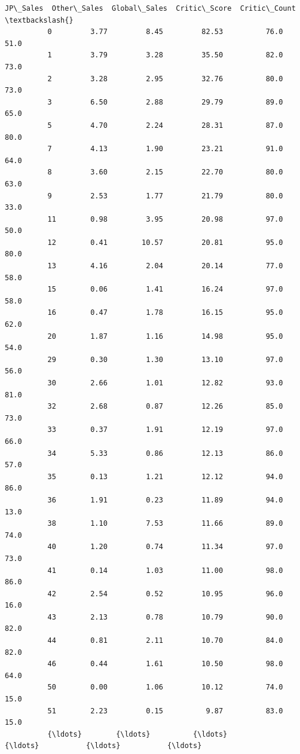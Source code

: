 \documentclass[11pt]{article}
\begin{document}
\begin{Verbatim}[commandchars=\\\{\}]
                JP\_Sales  Other\_Sales  Global\_Sales  Critic\_Score  Critic\_Count  \textbackslash{}
          0         3.77         8.45         82.53          76.0          51.0   
          1         3.79         3.28         35.50          82.0          73.0   
          2         3.28         2.95         32.76          80.0          73.0   
          3         6.50         2.88         29.79          89.0          65.0   
          5         4.70         2.24         28.31          87.0          80.0   
          7         4.13         1.90         23.21          91.0          64.0   
          8         3.60         2.15         22.70          80.0          63.0   
          9         2.53         1.77         21.79          80.0          33.0   
          11        0.98         3.95         20.98          97.0          50.0   
          12        0.41        10.57         20.81          95.0          80.0   
          13        4.16         2.04         20.14          77.0          58.0   
          15        0.06         1.41         16.24          97.0          58.0   
          16        0.47         1.78         16.15          95.0          62.0   
          20        1.87         1.16         14.98          95.0          54.0   
          29        0.30         1.30         13.10          97.0          56.0   
          30        2.66         1.01         12.82          93.0          81.0   
          32        2.68         0.87         12.26          85.0          73.0   
          33        0.37         1.91         12.19          97.0          66.0   
          34        5.33         0.86         12.13          86.0          57.0   
          35        0.13         1.21         12.12          94.0          86.0   
          36        1.91         0.23         11.89          94.0          13.0   
          38        1.10         7.53         11.66          89.0          74.0   
          40        1.20         0.74         11.34          97.0          73.0   
          41        0.14         1.03         11.00          98.0          86.0   
          42        2.54         0.52         10.95          96.0          16.0   
          43        2.13         0.78         10.79          90.0          82.0   
          44        0.81         2.11         10.70          84.0          82.0   
          46        0.44         1.61         10.50          98.0          64.0   
          50        0.00         1.06         10.12          74.0          15.0   
          51        2.23         0.15          9.87          83.0          15.0   
          {\ldots}        {\ldots}          {\ldots}           {\ldots}           {\ldots}           {\ldots}   

\end{Verbatim}
\end{document}
